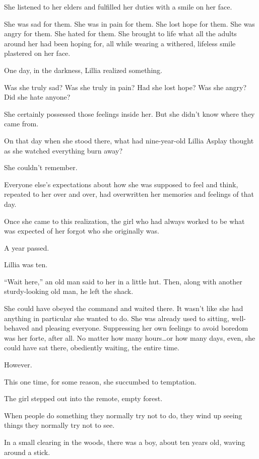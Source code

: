 She listened to her elders and fulfilled her duties with a smile on her face.

She was sad for them. She was in pain for them. She lost hope for them. She was angry for them. She hated for them. She brought to life what all the adults around her had been hoping for, all while wearing a withered, lifeless smile plastered on her face.

One day, in the darkness, Lillia realized something.

Was she truly sad? Was she truly in pain? Had she lost hope? Was she angry? Did she hate anyone?

She certainly possessed those feelings inside her. But she didn’t know where they came from.

On that day when she stood there, what had nine-year-old Lillia Asplay thought as she watched everything burn away?

She couldn’t remember.

Everyone else’s expectations about how she was supposed to feel and think, repeated to her over and over, had overwritten her memories and feelings of that day.

Once she came to this realization, the girl who had always worked to be what was expected of her forgot who she originally was.

\icon

A year passed.

Lillia was ten.

“Wait here,” an old man said to her in a little hut. Then, along with another sturdy-looking old man, he left the shack.

She could have obeyed the command and waited there. It wasn’t like she had anything in particular she wanted to do. She was already used to sitting, well-behaved and pleasing everyone. Suppressing her own feelings to avoid boredom was her forte, after all. No matter how many hours…or how many days, even, she could have sat there, obediently waiting, the entire time.

However.

This one time, for some reason, she succumbed to temptation.

The girl stepped out into the remote, empty forest.

When people do something they normally try not to do, they wind up seeing things they normally try not to see.

In a small clearing in the woods, there was a boy, about ten years old, waving around a stick.

